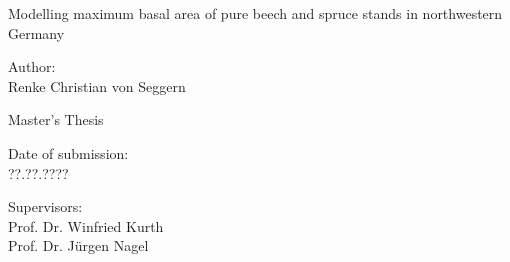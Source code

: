 \begin{titlepage}

\begin{center}

\vspace*{5cm}

{\LARGE Modelling maximum basal area of pure beech and spruce stands in northwestern Germany \\}

\vspace{2cm}

{\large Author: \\ Renke Christian von Seggern \par}

\vspace{2cm}

{\normalsize Master’s Thesis}

\vspace{0.5cm}

{\normalsize Date of submission: \\ ??.??.???? \par}

\vspace{0.5cm}

{\normalsize Supervisors: \\ Prof. Dr. Winfried Kurth \\ Prof. Dr. Jürgen Nagel \par}

\end{center}

\end{titlepage}

